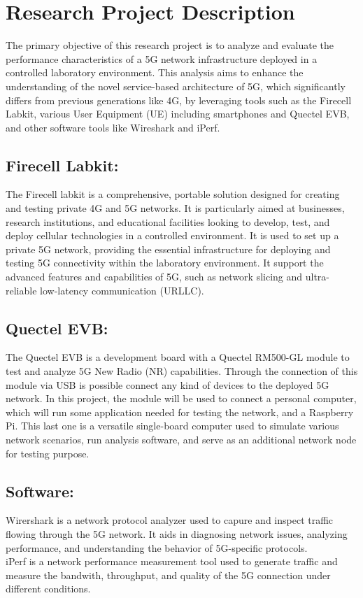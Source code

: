 \documentclass{report}
\begin{document}
\chapter{Research Project Description}
The primary objective of this research project is to analyze and evaluate the performance characteristics of a 5G network infrastructure deployed in a controlled laboratory environment. This analysis aims to enhance the understanding of the novel service-based architecture of 5G, which significantly differs from previous generations like 4G, by leveraging tools such as the Firecell Labkit, various User Equipment (UE) including smartphones and Quectel EVB, and other software tools like Wireshark and iPerf.
\section*{Firecell Labkit:}
The Firecell labkit is a comprehensive, portable solution designed for creating and testing private 4G and 5G networks. It is particularly aimed at businesses, research institutions, and educational facilities looking to develop, test, and deploy cellular technologies in a controlled environment. It is used to set up a private 5G network, providing the essential infrastructure for deploying and testing 5G connectivity within the laboratory environment. It support the advanced features and capabilities of 5G, such as network slicing and ultra-reliable low-latency communication (URLLC). 
\section*{Quectel EVB:}
The Quectel EVB is a development board with a Quectel RM500-GL module to test and analyze 5G New Radio (NR) capabilities. Through the connection of this module via USB is possible connect any kind of devices to the deployed 5G network. In this project, the module will be used to connect a personal computer, which will run some application needed for testing the network, and a Raspberry Pi. This last one is a versatile single-board computer used to simulate various network scenarios, run analysis software, and serve as an additional network node for testing purpose. 
\section*{Software:}
Wirershark is a network protocol analyzer used to capure and inspect traffic flowing through the 5G network. It aids in diagnosing network issues, analyzing performance, and understanding the behavior of 5G-specific protocols. 
\\iPerf is a network performance measurement tool used to generate traffic and measure the bandwith, throughput, and quality of the 5G connection under different conditions. \\
\end{document}

